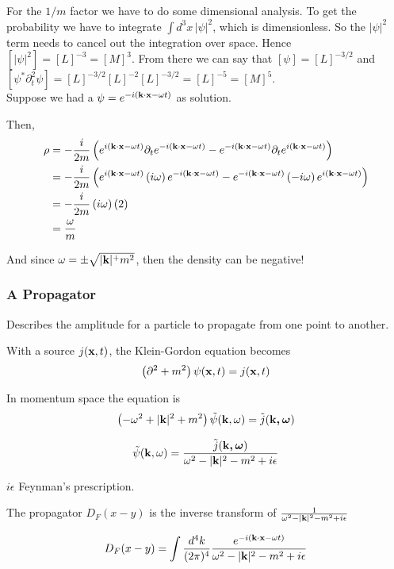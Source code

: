 For the $1/m$ factor we have to do some dimensional analysis.
To get the probability we have to integrate $\int d^3x \, |\psi|^2$, which is dimensionless.
So the $|\psi|^2$ term needs to cancel out the integration over space.
Hence $[|\psi|^2] = [L]^{-3} = [M]^{3}$.
From there we can say that $[\psi] = [L]^{-3/2}$ and
$[\psi^* \partial_{t}^2 \psi] = [L]^{-3/2}[L]^{-2}[L]^{-3/2} = [L]^{-5} = [M]^{5}$.
\\


Suppose we had a $\psi =  e^{-i(\boldsymbol{\mathbf{k}}\cdot\boldsymbol{\mathbf{x}} -\omega t)}$ as solution.

Then,
\begin{align*}
\rho &=
    -\frac{i}{2m} \left( 
        e^{i(\boldsymbol{\mathbf{k}}\cdot\boldsymbol{\mathbf{x}} -\omega t)} \partial_t e^{-i(\boldsymbol{\mathbf{k}}\cdot\boldsymbol{\mathbf{x}} -\omega t)} -
        e^{-i(\boldsymbol{\mathbf{k}}\cdot\boldsymbol{\mathbf{x}} -\omega t)} \partial_t e^{i(\boldsymbol{\mathbf{k}}\cdot\boldsymbol{\mathbf{x}} -\omega t)} 
    \right) \\
&= -\frac{i}{2m} \left(
    e^{i(\boldsymbol{\mathbf{k}}\cdot\boldsymbol{\mathbf{x}} -\omega t)} \left(i\omega\right) e^{-i(\boldsymbol{\mathbf{k}}\cdot\boldsymbol{\mathbf{x}} -\omega t)} -
    e^{-i(\boldsymbol{\mathbf{k}}\cdot\boldsymbol{\mathbf{x}} -\omega t)} \left(-i\omega\right) e^{i(\boldsymbol{\mathbf{k}}\cdot\boldsymbol{\mathbf{x}} -\omega t)}
    \right) \\
&= -\frac{i}{2m} \left(i\omega\right) \left( 2 \right) \\
&= \frac{\omega}{m}
\end{align*}

And since $\omega = \pm \sqrt{|\boldsymbol{\mathbf{k}}|^ + m^2}$, then the density can be negative!



\subsubsection{A Propagator}

Describes the amplitude for a particle to propagate from one point to another.

With a source $j(\boldsymbol{\mathbf{x}}, t)$, the Klein-Gordon equation becomes
$$
\left( \partial^2 + m^2 \right) \psi(\boldsymbol{\mathbf{x}}, t) = j(\boldsymbol{\mathbf{x}}, t)
$$

In momentum space the equation is
$$
\left( -\omega^2 + |\boldsymbol{\mathbf{k}}|^2 + m^2 \right) \tilde{\psi}(\boldsymbol{\mathbf{k}}, \omega) = \tilde{j}(\boldsymbol{\mathbf{\boldsymbol{\mathbf{k}}, \omega}})
$$

$$
\tilde{\psi}(\boldsymbol{\mathbf{k}}, \omega) = \frac{ \tilde{j}(\boldsymbol{\mathbf{\boldsymbol{\mathbf{k}}, \omega}}) }{ \omega^2 - |\boldsymbol{\mathbf{k}}|^2 - m^2 + i\epsilon }
$$

$i\epsilon$ Feynman's prescription.

The propagator $D_F(x-y)$ is the inverse transform of
$\frac{ 1 }{ \omega^2 - |\boldsymbol{\mathbf{k}}|^2 - m^2 + i\epsilon }$

$$
D_F(x-y) = \int \frac{d^4k}{(2\pi)^4}
    \frac{ e^{-i(\boldsymbol{\mathbf{k}}\cdot\boldsymbol{\mathbf{x}} -\omega t)} }{ \omega^2 - |\boldsymbol{\mathbf{k}}|^2 - m^2 + i\epsilon }
$$